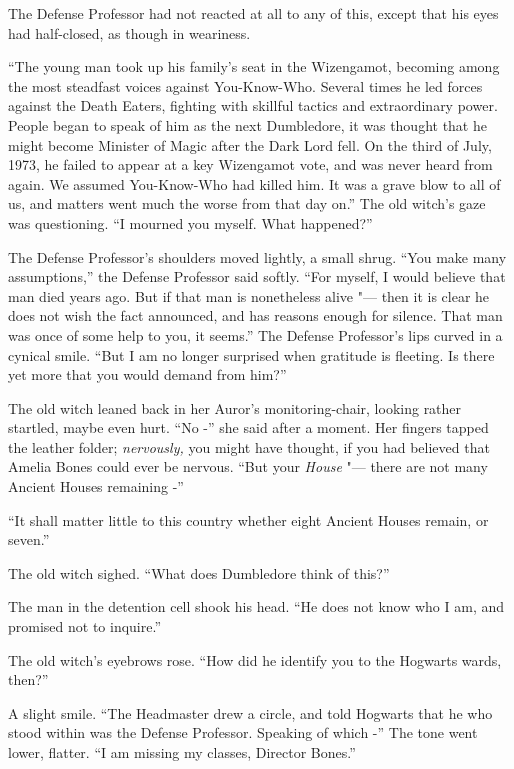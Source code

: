 The Defense Professor had not reacted at all to any of this, except that
his eyes had half-closed, as though in weariness.

``The young man took up his family's seat in the Wizengamot, becoming
among the most steadfast voices against You-Know-Who. Several times he
led forces against the Death Eaters, fighting with skillful tactics and
extraordinary power. People began to speak of him as the next
Dumbledore, it was thought that he might become Minister of Magic after
the Dark Lord fell. On the third of July, 1973, he failed to appear at a
key Wizengamot vote, and was never heard from again. We assumed
You-Know-Who had killed him. It was a grave blow to all of us, and
matters went much the worse from that day on.'' The old witch's gaze was
questioning. ``I mourned you myself. What happened?''

The Defense Professor's shoulders moved lightly, a small shrug. ``You
make many assumptions,'' the Defense Professor said softly. ``For
myself, I would believe that man died years ago. But if that man is
nonetheless alive "--- then it is clear he does not wish the fact
announced, and has reasons enough for silence. That man was once of some
help to you, it seems.'' The Defense Professor's lips curved in a
cynical smile. ``But I am no longer surprised when gratitude is
fleeting. Is there yet more that you would demand from him?''

The old witch leaned back in her Auror's monitoring-chair, looking
rather startled, maybe even hurt. ``No -'' she said after a moment. Her
fingers tapped the leather folder; \emph{nervously,} you might have
thought, if you had believed that Amelia Bones could ever be nervous.
``But your \emph{House} "--- there are not many Ancient Houses remaining -''

``It shall matter little to this country whether eight Ancient Houses
remain, or seven.''

The old witch sighed. ``What does Dumbledore think of this?''

The man in the detention cell shook his head. ``He does not know who I
am, and promised not to inquire.''

The old witch's eyebrows rose. ``How did he identify you to the Hogwarts
wards, then?''

A slight smile. ``The Headmaster drew a circle, and told Hogwarts that
he who stood within was the Defense Professor. Speaking of which -'' The
tone went lower, flatter. ``I am missing my classes, Director Bones.''

